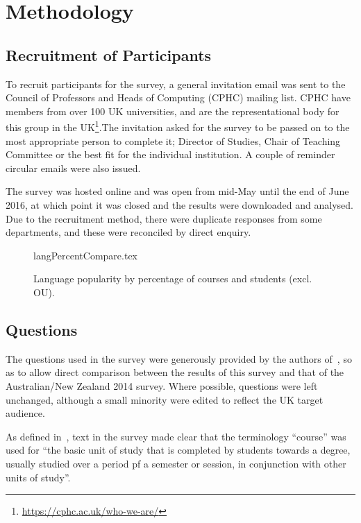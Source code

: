 \documentclass{sig-alternate}
\begin{document}
\section{Methodology}\label{method}

\subsection{Recruitment of Participants}

To recruit participants for the survey, a general invitation email was
sent to the Council of Professors and Heads of Computing (CPHC)
mailing list. CPHC have members from over 100 UK universities, and are
the representational body for this group in the
UK\footnote{\url{https://cphc.ac.uk/who-we-are/}}.The invitation
asked for the survey to be passed on to the most appropriate person to
complete it; Director of Studies, Chair of Teaching Committee or the
best fit for the individual institution. A couple of reminder circular
emails were also issued.

The survey was hosted online and was open from mid-May until the end
of June 2016, at which point it was closed and the results were
downloaded and analysed. Due to the recruitment method, there were
duplicate responses from some departments, and these were reconciled
by direct enquiry.
\begin{figure}
\begin{center}
{langPercentCompare.tex}
\end{center}\vskip-12pt
\caption{Language popularity by percentage of courses and students (excl. OU).\label{fig:lang}}
\end{figure}

\subsection{Questions}

The questions used in the survey were generously provided by the
authors of~\cite{mason+cooper:2014}, so as to allow direct comparison
between the results of this survey and that of the Australian/New
Zealand 2014 survey. Where possible, questions were left unchanged,
although a small minority were edited to reflect the UK target
audience. 

As defined in~\cite{mason+cooper:2014}, text in the survey made clear
that the terminology ``course'' was used for ``the basic unit of study
that is completed by students towards a degree, usually studied over a
period pf a semester or session, in conjunction with other units of
study''.
\end{document}
